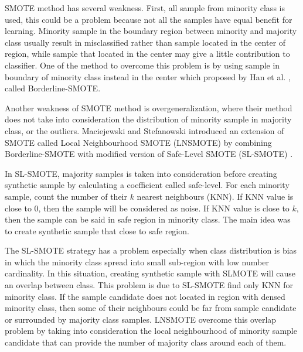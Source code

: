 SMOTE method has several weakness.
First, all sample from minority class is used, this could be a problem because
not all the samples have equal benefit for learning.
Minority sample in the boundary region between minority and majority class
usually result in misclassified rather than sample located in the center of
region, while sample that located in the center may give a little contribution
to classifier.
One of the method to overcome this problem is by using sample in boundary of
minority class instead in the center which proposed by Han et al.
\cite{han2005borderline}, called Borderline-SMOTE.

Another weakness of SMOTE method is overgeneralization, where their method does
not take into consideration the distribution of minority sample in majority
class, or the outliers.
Maciejewski and Stefanowski \cite{maciejewski2011local}
introduced an extension of SMOTE called Local Neighbourhood
SMOTE (LNSMOTE) \cite{maciejewski2011local} by combining Borderline-SMOTE
with modified version of Safe-Level SMOTE (SL-SMOTE)
\cite{bunkhumpornpat2009safe}.

In SL-SMOTE, majority samples is taken into consideration before creating
synthetic sample by calculating a coefficient called safe-level.
For each minority sample, count the number of their $k$ nearest neighbours (KNN).
If KNN value is close to 0, then the sample will be considered as noise.
If KNN value is close to $k$, then the sample can be said in safe region in
minority class.
The main idea was to create synthetic sample that close to safe region.

The SL-SMOTE strategy has a problem especially when class distribution is bias
in which the minority class spread into small sub-region with low number
cardinality.
In this situation, creating synthetic sample with SLMOTE will cause an overlap
between class.
This problem is due to SL-SMOTE find only KNN for minority class.
If the sample candidate does not located in region with densed minority class,
then some of their neighbours could be far from sample candidate or surrounded
by majority class samples.
LNSMOTE overcome this overlap problem by taking into consideration the local
neighbourhood of minority sample candidate that can provide the number of
majority class around each of them.
